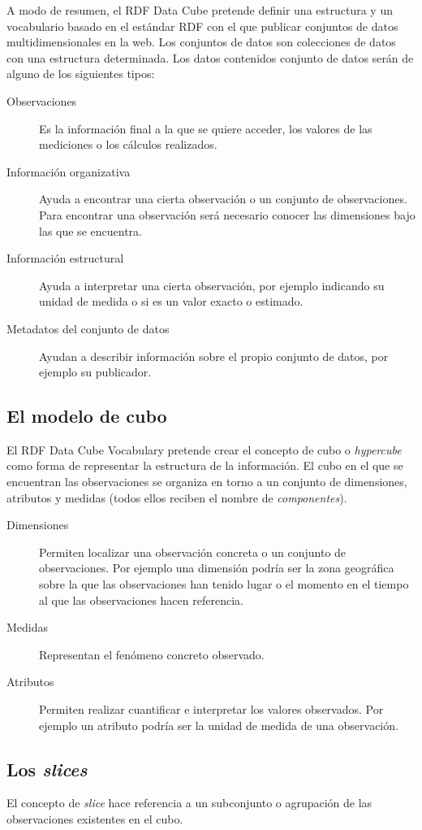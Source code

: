 A modo de resumen, el RDF Data Cube pretende definir una estructura y un vocabulario basado en el estándar RDF con el que publicar conjuntos de datos multidimensionales en la web.  Los conjuntos de datos son colecciones de datos con una estructura determinada.  Los datos contenidos conjunto de datos serán de alguno de los siguientes tipos:
\begin{description}
\item[Observaciones]  Es la información final a la que se quiere acceder, los valores de las mediciones o los cálculos realizados.
\item[Información organizativa]  Ayuda a encontrar una cierta observación o un conjunto de observaciones.  Para encontrar una observación será necesario conocer las dimensiones bajo las que se encuentra.
\item[Información estructural]   Ayuda a interpretar una cierta observación, por ejemplo indicando su unidad de medida o si es un valor exacto o estimado.
\item[Metadatos del conjunto de datos]  Ayudan a describir información sobre el propio conjunto de datos, por ejemplo su publicador.
\end{description}

\subsection{El modelo de cubo}
El RDF Data Cube Vocabulary pretende crear el concepto de cubo o \textit{hypercube} como forma de representar la estructura de la información. El cubo en el que se encuentran las observaciones se organiza en torno a un conjunto de dimensiones, atributos y medidas (todos ellos reciben el nombre de \textit{componentes}).
\begin{description}
\item[Dimensiones]  Permiten localizar una observación concreta o un conjunto de observaciones.  Por ejemplo una dimensión podría ser la zona geográfica sobre la que las observaciones han tenido lugar o el momento en el tiempo al que las observaciones hacen referencia.
\item[Medidas]  Representan el fenómeno concreto observado.
\item[Atributos]  Permiten realizar cuantificar e interpretar los valores observados.  Por ejemplo un atributo podría ser la unidad de medida de una observación.
\end{description}

\subsection{Los \textit{slices}}
El concepto de \textit{slice} hace referencia a un subconjunto o agrupación de las observaciones existentes en el cubo.

